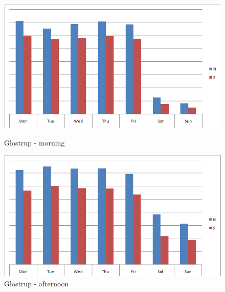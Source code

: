 \begin{figure}[ht]

    \begin{minipage}[b]{0.5\linewidth}

\begin{center}
\includegraphics[scale=0.25]{glostrup_direction_proportions_morning.png} 
\end{center}
\caption{Glostrup - morning}
\label{fig:glostrup_props_morning}

    \end{minipage}
    \hspace{0.5cm}
    \begin{minipage}[b]{0.5\linewidth}
    
\begin{center}
\includegraphics[scale=0.25]{glostrup_direction_proportions_afternoon.png} 
\end{center}
\caption{Glostrup - afternoon}
\label{fig:glostrup_props_afternoon}

    \end{minipage}

\end{figure}

